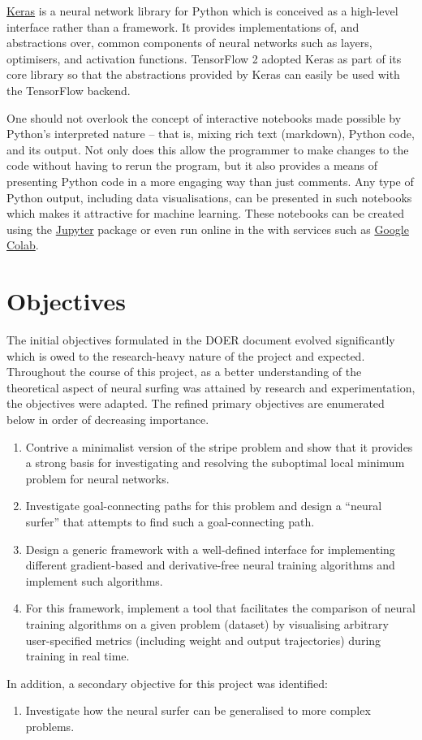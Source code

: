 \href{https://keras.io/}{Keras} is a neural network library for Python which is conceived as a high-level interface rather than a framework. 
It provides implementations of, and abstractions over, common components of neural networks such as layers, optimisers, and activation functions.
TensorFlow 2 adopted Keras as part of its core library so that the abstractions provided by Keras can easily be used with the TensorFlow backend.

One should not overlook the concept of interactive notebooks made possible by Python's interpreted nature -- that is, mixing rich text (markdown), Python code, and its output. 
Not only does this allow the programmer to make changes to the code without having to rerun the program, but it also provides a means of presenting Python code in a more engaging way than just comments.
Any type of Python output, including data visualisations, can be presented in such notebooks which makes it attractive for machine learning.
These notebooks can be created using the \href{https://jupyter.org/}{Jupyter} package or even run online in the with services such as \href{https://colab.research.google.com/}{Google Colab}. 

\section{Objectives}
\label{sec:objectives}
The initial objectives formulated in the DOER document evolved significantly which is owed to the research-heavy nature of the project and expected.
Throughout the course of this project, as a better understanding of the theoretical aspect of neural surfing was attained by research and experimentation, the objectives were adapted.
The refined primary objectives are enumerated below in order of decreasing importance.
\begin{enumerate}
    \item Contrive a minimalist version of the stripe problem and show that it provides a strong basis for investigating and resolving the suboptimal local minimum problem for neural networks.
    \item Investigate goal-connecting paths for this problem and design a “neural surfer” that attempts to find such a goal-connecting path.
    \item Design a generic framework with a well-defined interface for implementing different gradient-based and derivative-free neural training algorithms and implement such algorithms.
    \item For this framework, implement a tool that facilitates the comparison of neural training algorithms on a given problem (dataset) by visualising arbitrary user-specified metrics (including weight and output trajectories) during training in real time.
\end{enumerate}
In addition, a secondary objective for this project was identified:
\begin{enumerate}[resume]
    \item Investigate how the neural surfer can be generalised to more complex problems.
\end{enumerate}

